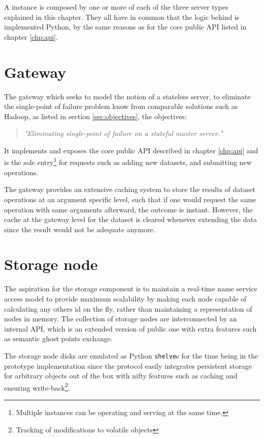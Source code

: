 A \CodeName instance is composed by one or more of each of the three server types explained in this chapter. They all have in common that the logic behind is implemented Python, by the same reasons as for the core public API listed in chapter \ref{chp:api}.

\section{Gateway} \label{sec:gateway}
The \CodeName gateway which seeks to model the notion of a stateless server, to eliminate the single-point of failure problem know from comparable solutions such as Hadoop, as listed in section \ref{sec:objectives}, the objectives:
\begin{quotation}
	\textit{"Eliminating single-point of failure on a stateful master server."}
\end{quotation}

It implements and exposes the core public API described in chapter \ref{chp:api} and is the sole entry\footnote{Multiple instances can be operating and serving at the same time.} for requests such as adding new datasets, and submitting new operations.
\newline

The gateway provides an extensive caching system to store the results of dataset operations at an argument specific level, such that if one would request the same operation with same arguments afterward, the outcome is instant. However, the cache at the gateway level for the dataset is cleared whenever extending the data since the result would not be adequate anymore.

\section{Storage node} \label{sec:storage}
The aspiration for the storage component is to maintain a real-time name service access model to provide maximum scalability by making each node capable of calculating any others id on the fly, rather than maintaining a representation of nodes in memory. The collection of storage nodes are interconnected by an internal API, which is an extended version of public one with extra features such as semantic ghost points exchange.
\newline

The storage node disks are emulated as Python \texttt{shelve}s \cite{PageShelve} for the time being in the prototype implementation since the protocol easily integrates persistent storage for arbitrary objects out of the box with nifty features such as caching and ensuring write-back\footnote{Tracking of modifications to volatile objects}.


